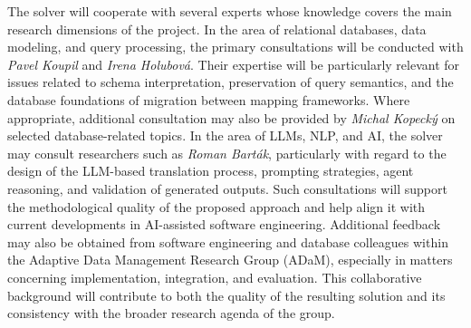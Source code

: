 \documentclass{article}
\begin{document}
The solver will cooperate with several experts whose knowledge covers the main research dimensions of the project. In the area of relational databases, data modeling, and query processing, the primary consultations will be conducted with \textit{Pavel Koupil} and \textit{Irena Holubová}. Their expertise will be particularly relevant for issues related to schema interpretation, preservation of query semantics, and the database foundations of migration between mapping frameworks. Where appropriate, additional consultation may also be provided by \textit{Michal Kopecký} on selected database-related topics.
In the area of LLMs, NLP, and AI, the solver may consult researchers such as \textit{Roman Barták}, particularly with regard to the design of the LLM-based translation process, prompting strategies, agent reasoning, and validation of generated outputs. Such consultations will support the methodological quality of the proposed approach and help align it with current developments in AI-assisted software engineering.
Additional feedback may also be obtained from software engineering and database colleagues within the Adaptive Data Management Research Group (ADaM), especially in matters concerning implementation, integration, and evaluation. This collaborative background will contribute to both the quality of the resulting solution and its consistency with the broader research agenda of the group.
\end{document}
